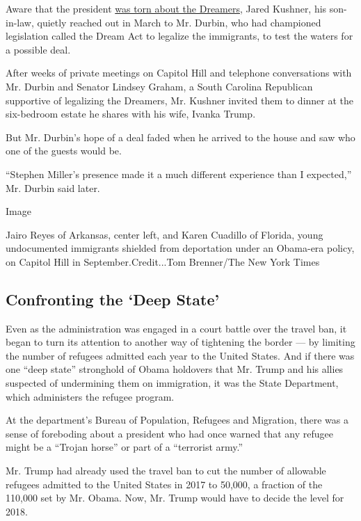 Aware that the president
\href{https://www.nytimes3xbfgragh.onion/2017/02/26/us/politics/daca-dreamers-immigration-trump.html}{was
torn about the Dreamers}, Jared Kushner, his son-in-law, quietly reached
out in March to Mr. Durbin, who had championed legislation called the
Dream Act to legalize the immigrants, to test the waters for a possible
deal.

After weeks of private meetings on Capitol Hill and telephone
conversations with Mr. Durbin and Senator Lindsey Graham, a South
Carolina Republican supportive of legalizing the Dreamers, Mr. Kushner
invited them to dinner at the six-bedroom estate he shares with his
wife, Ivanka Trump.

But Mr. Durbin's hope of a deal faded when he arrived to the house and
saw who one of the guests would be.

``Stephen Miller's presence made it a much different experience than I
expected,'' Mr. Durbin said later.

Image

Jairo Reyes of Arkansas, center left, and Karen Cuadillo of Florida,
young undocumented immigrants shielded from deportation under an
Obama-era policy, on Capitol Hill in September.Credit...Tom Brenner/The
New York Times

\hypertarget{confronting-the-deep-state}{%
\subsection{Confronting the `Deep
State'}\label{confronting-the-deep-state}}

Even as the administration was engaged in a court battle over the travel
ban, it began to turn its attention to another way of tightening the
border --- by limiting the number of refugees admitted each year to the
United States. And if there was one ``deep state'' stronghold of Obama
holdovers that Mr. Trump and his allies suspected of undermining them on
immigration, it was the State Department, which administers the refugee
program.

At the department's Bureau of Population, Refugees and Migration, there
was a sense of foreboding about a president who had once warned that any
refugee might be a ``Trojan horse'' or part of a ``terrorist army.''

Mr. Trump had already used the travel ban to cut the number of allowable
refugees admitted to the United States in 2017 to 50,000, a fraction of
the 110,000 set by Mr. Obama. Now, Mr. Trump would have to decide the
level for 2018.

